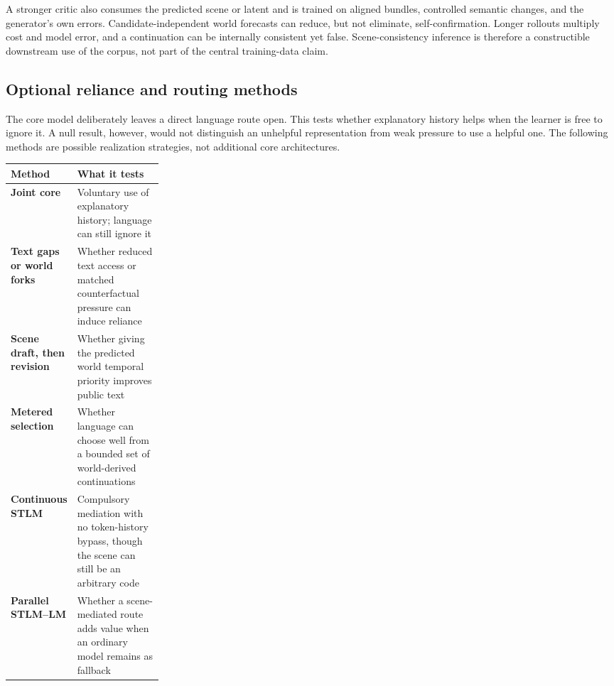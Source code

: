 \documentclass[11pt]{article}
\begin{document}
A stronger critic also consumes the predicted scene or latent and is trained on aligned bundles, controlled semantic changes, and the generator's own errors. Candidate-independent world forecasts can reduce, but not eliminate, self-confirmation. Longer rollouts multiply cost and model error, and a continuation can be internally consistent yet false. Scene-consistency inference is therefore a constructible downstream use of the corpus, not part of the central training-data claim.

\subsection{Optional reliance and routing methods}
\label{sec:routing}

The core model deliberately leaves a direct language route open. This tests whether explanatory history helps when the learner is free to ignore it. A null result, however, would not distinguish an unhelpful representation from weak pressure to use a helpful one. The following methods are possible realization strategies, not additional core architectures.

\begin{center}
\small
\begin{tabularx}{0.97\linewidth}{@{}>{\bfseries}p{0.25\linewidth}X@{}}
\toprule
Method & What it tests \\
\midrule
Joint core & Voluntary use of explanatory history; language can still ignore it \\
Text gaps or world forks & Whether reduced text access or matched counterfactual pressure can induce reliance \\
Scene draft, then revision & Whether giving the predicted world temporal priority improves public text \\
Metered selection & Whether language can choose well from a bounded set of world-derived continuations \\
Continuous STLM & Compulsory mediation with no token-history bypass, though the scene can still be an arbitrary code \\
Parallel STLM--LM & Whether a scene-mediated route adds value when an ordinary model remains as fallback \\
\bottomrule
\end{tabularx}
\end{center}
\end{document}
